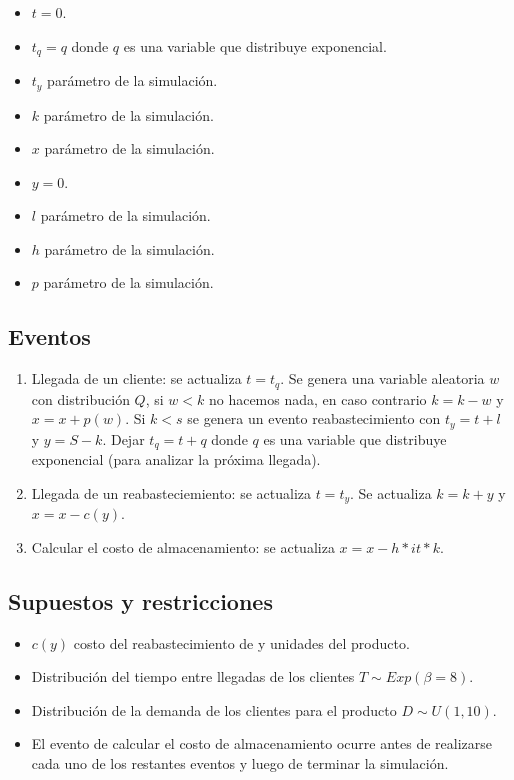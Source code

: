 \documentclass{article}
\begin{document}
\begin{itemize}
    \item $t=0$.
    \item $t_q=q$ donde $q$ es una variable que distribuye exponencial.
    \item $t_y$ parámetro de la simulación.
    \item $k$ parámetro de la simulación.
    \item $x$ parámetro de la simulación.
    \item $y=0$.
    \item $l$ parámetro de la simulación.
    \item $h$ parámetro de la simulación.
    \item $p$ parámetro de la simulación.
\end{itemize}

\subsection*{Eventos}

\begin{enumerate}
    \item Llegada de un cliente: se actualiza $t=t_q$. Se genera una variable aleatoria $w$ con distribución $Q$, si $w<k$ no hacemos nada, en caso contrario $k=k-w$ y $x=x+p(w)$. Si $k<s$ se genera un evento reabastecimiento con $t_y=t+l$ y $y=S-k$. Dejar $t_q=t+q$ donde $q$ es una variable que distribuye exponencial (para analizar la próxima llegada).
    \item Llegada de un reabasteciemiento: se actualiza $t=t_y$. Se actualiza $k=k+y$ y $x=x-c(y)$.
    \item Calcular el costo de almacenamiento: se actualiza $x=x-h*it*k$.
\end{enumerate}

\subsection*{Supuestos y restricciones}

\begin{itemize}
    \item $c(y)$ costo del reabastecimiento de y unidades del producto.
    \item  Distribución del tiempo entre llegadas de los clientes $T \sim Exp(\beta = 8)$.
    \item  Distribución de la demanda de los clientes para el producto $D \sim U(1,10)$.
    \item  El evento de calcular el costo de almacenamiento ocurre antes de realizarse cada uno de los restantes eventos y luego de terminar la simulación.

\end{itemize}
\end{document}
